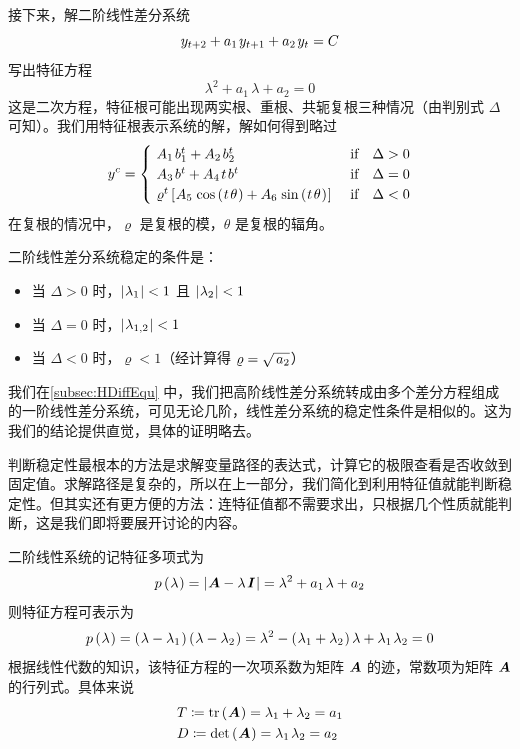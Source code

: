 
接下来，解二阶线性差分系统
\begin{equation*}
    y\nnt + a_1\,y\nt + a_2\,y_t = C
\end{equation*}
写出特征方程
\begin{equation*}
    \lambda^2 + a_1\,\lambda + a_2 = 0
\end{equation*}
这是二次方程，特征根可能出现两实根、重根、共轭复根三种情况（由判别式 \(\Delta\) 可知）。我们用特征根表示系统的解，解如何得到略过
\begin{equation*}
    y^c=\begin{cases}
        \ A_1\,b^t_1+A_2\,b^t_2 & \n{ if}\quad \Delta>0\\
        \ A_3\,b^t + A_4\,t\,b^t & \n{ if}\quad \Delta=0\\
        \ \varrho^t\bks{A_5\,\cos\bka{t\,\theta} + A_6\,\sin\bka{t\,\theta}} & \n{ if}\quad \Delta<0
    \end{cases}
\end{equation*}
在复根的情况中，\(\varrho\) 是复根的模，\(\theta\) 是复根的辐角。

二阶线性差分系统稳定的条件是：
\begin{itemize}
    \item 当 \(\Delta>0\) 时，\(\left|\mspace{1mu}\lambda_1\mspace{1mu}\right|<1\) 且 \(\left|\mspace{1mu}\lambda_2\mspace{1mu}\right|<1\)
    \item 当 \(\Delta=0\) 时，\(\left|\mspace{1mu}\lambda_{1,2}\mspace{1mu}\right|<1\)
    \item 当 \(\Delta<0\) 时，\(\varrho<1\)（经计算得 \(\varrho=\dsq{a_2}\)）
\end{itemize}
我们在\ref{subsec:HDiffEqu} 中，我们把高阶线性差分系统转成由多个差分方程组成的一阶线性差分系统，可见无论几阶，线性差分系统的稳定性条件是相似的。这为我们的结论提供直觉，具体的证明略去。


判断稳定性最根本的方法是求解变量路径的表达式，计算它的极限查看是否收敛到固定值。求解路径是复杂的，所以在上一部分，我们简化到利用特征值就能判断稳定性。但其实还有更方便的方法：连特征值都不需要求出，只根据几个性质就能判断，这是我们即将要展开讨论的内容。

二阶线性系统的记特征多项式为
\begin{equation*}
    p\bka\lambda=\bkf{\bsA-\lambda\,\bsI}=\lambda^2 + a_1\,\lambda + a_2
\end{equation*}
则特征方程可表示为
\begin{align*}
    p\bka\lambda=\bka{\lambda-\lambda_1}\bka{\lambda-\lambda_2}= \lambda^2 - \bka{\lambda_1+\lambda_2}\lambda + \lambda_1\,\lambda_2=0
\end{align*}
根据线性代数的知识，该特征方程的一次项系数为矩阵 \(\bm{A}\) 的迹，常数项为矩阵 \(\bm{A}\) 的行列式。具体来说
\begin{align*}
    &T\coloneq \tr\bka{\bsA}=\lambda_1+\lambda_2=a_1\\
    &D\coloneq \det\bka{\bsA}=\lambda_1\,\lambda_2=a_2
\end{align*}


